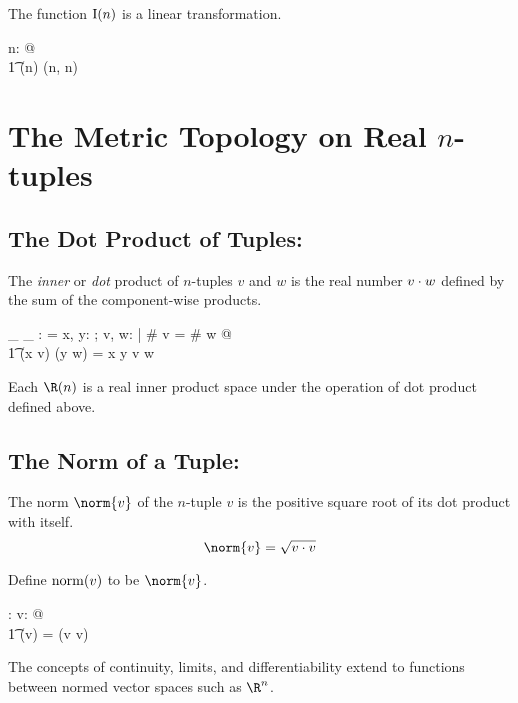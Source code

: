 \documentclass{amsart}
\begin{document}
\begin{remark}
The function $\operatorname{I}(n)$ is a linear transformation.

\begin{zed}
	\forall n: \nat @ \\
	\t1	\idRtup(n) \in \linRtup(n, n)
\end{zed}

\end{remark}

\section{The Metric Topology on Real $n$-tuples}

\subsection{The Dot Product of Tuples: }

The {\it inner} or {\it dot} product of $n$-tuples $v$ and $w$ is the real number $v \mathbin{\cdot} w$ 
defined by the sum of the component-wise products.

\begin{axdef}
	\_ \dotRinf \_ : \RinfDelta \fun \R
\where
	\langle \rangle \dotRinf \langle \rangle = \zeroR
\also
	\forall x, y: \R; v, w: \Rinf | \# v = \# w @ \\
	\t1	(\langle x \rangle \cat v) \dotRinf (\langle y \rangle \cat w) = x \mulR y \addR v \dotRinf w
\end{axdef}

Each $\Rtup(n)$ is a real inner product space under the operation of dot product defined above.

\subsection{The Norm of a Tuple: }

The norm $\norm{v}$ of the $n$-tuple $v$ is the positive square root of its dot product with itself.
$$
	\norm{v} = \sqrt{v \dotRinf v}
$$

Define $\operatorname{norm}(v)$ to be $\norm{v}$.
\begin{axdef}
	\normRinf: \Rinf \fun \R
\where
	\forall v: \Rinf @ \\
	\t1	\normRinf(v) = \sqrtR(v \dotRinf v)
\end{axdef}

The concepts of continuity, limits, and differentiability extend to functions between normed vector spaces such as $\R^n$.
\end{document}
